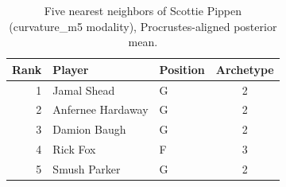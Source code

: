 \begin{table}[htbp]
  \centering\small
  \begin{tabular}{rllc}
    \toprule
    Rank & Player & Position & Archetype \\
    \midrule
    1 & Jamal Shead & G & 2 \\
    2 & Anfernee Hardaway & G & 2 \\
    3 & Damion Baugh & G & 2 \\
    4 & Rick Fox & F & 3 \\
    5 & Smush Parker & G & 2 \\
    \bottomrule
  \end{tabular}
  \caption{Five nearest neighbors of Scottie Pippen (curvature_m5 modality), Procrustes-aligned posterior mean.}
  \label{tab:Scottie_Pippen_neighbors_curvature_m5}
\end{table}

